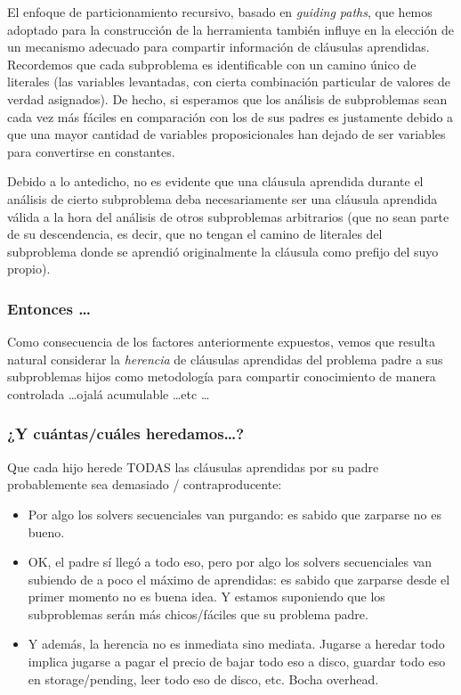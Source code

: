 El enfoque de particionamiento recursivo, basado en \emph{guiding paths}, que
hemos adoptado para la construcción de la herramienta también influye en la
elección de un mecanismo adecuado para compartir información de cláusulas
aprendidas. Recordemos que cada subproblema es identificable con un camino
único de literales (las variables levantadas, con cierta combinación
particular de valores de verdad asignados). De hecho, si esperamos que los
análisis de subproblemas sean cada vez más fáciles en comparación con los de
sus padres es justamente debido a que una mayor cantidad de variables
proposicionales han dejado de ser variables para convertirse en constantes.

Debido a lo antedicho, no es evidente que una cláusula aprendida durante el
análisis de cierto subproblema deba necesariamente ser una cláusula aprendida
válida a la hora del análisis de otros subproblemas arbitrarios (que no sean
parte de su descendencia, es decir, que no tengan el camino de literales del
subproblema donde se aprendió originalmente la cláusula como prefijo del suyo
propio).


\subsubsection{Entonces \ldots}

Como consecuencia de los factores anteriormente expuestos, vemos que resulta
natural considerar la \emph{herencia} de cláusulas aprendidas del problema
padre a sus subproblemas hijos como metodología para compartir conocimiento de
manera controlada \ldots ojalá acumulable \ldots etc \ldots


\subsubsection{¿Y cuántas/cuáles heredamos\ldots?}

Que cada hijo herede TODAS las cláusulas aprendidas por su padre probablemente sea demasiado / contraproducente:
\begin{itemize}
\item Por algo los solvers secuenciales van purgando: es sabido que zarparse no es bueno.
\item OK, el padre sí llegó a todo eso, pero por algo los solvers secuenciales van subiendo de a poco el máximo de aprendidas: es sabido que zarparse desde el primer momento no es buena idea. Y estamos suponiendo que los subproblemas serán más chicos/fáciles que su problema padre.
\item Y además, la herencia no es inmediata sino mediata. Jugarse a heredar todo implica jugarse a pagar el precio de bajar todo eso a disco, guardar todo eso en storage/pending, leer todo eso de disco, etc. Bocha overhead.
\end{itemize}

